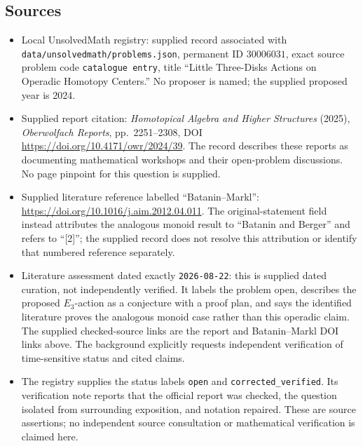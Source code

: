 \documentclass[11pt]{article}
\begin{document}
\subsection{Sources}
\begin{itemize}
\item Local UnsolvedMath registry: supplied record associated with \texttt{data/unsolvedmath/problems.json}, permanent ID \(30006031\), exact source problem code \texttt{catalogue entry}, title ``Little Three-Disks Actions on Operadic Homotopy Centers.'' No proposer is named; the supplied proposed year is 2024.
\item Supplied report citation: \emph{Homotopical Algebra and Higher Structures} (2025), \emph{Oberwolfach Reports}, pp.\ 2251--2308, DOI \url{https://doi.org/10.4171/owr/2024/39}. The record describes these reports as documenting mathematical workshops and their open-problem discussions. No page pinpoint for this question is supplied.
\item Supplied literature reference labelled ``Batanin--Markl'': \url{https://doi.org/10.1016/j.aim.2012.04.011}. The original-statement field instead attributes the analogous monoid result to ``Batanin and Berger'' and refers to ``[2]''; the supplied record does not resolve this attribution or identify that numbered reference separately.
\item Literature assessment dated exactly \texttt{2026-08-22}: this is supplied dated curation, not independently verified. It labels the problem open, describes the proposed \(E_3\)-action as a conjecture with a proof plan, and says the identified literature proves the analogous monoid case rather than this operadic claim. The supplied checked-source links are the report and Batanin--Markl DOI links above. The background explicitly requests independent verification of time-sensitive status and cited claims.
\item The registry supplies the status labels \texttt{open} and \texttt{corrected\_verified}. Its verification note reports that the official report was checked, the question isolated from surrounding exposition, and notation repaired. These are source assertions; no independent source consultation or mathematical verification is claimed here.
\end{itemize}
\end{document}
